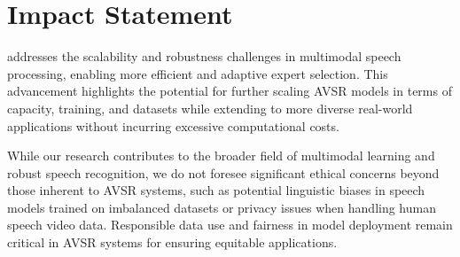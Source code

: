 \section*{Impact Statement}

\ourmodel addresses the scalability and robustness challenges in multimodal speech processing, enabling more efficient and adaptive expert selection. This advancement highlights the potential for further scaling AVSR models in terms of capacity, training, and datasets while extending to more diverse real-world applications without incurring excessive computational costs.

While our research contributes to the broader field of multimodal learning and robust speech recognition, we do not foresee significant ethical concerns beyond those inherent to AVSR systems, such as potential linguistic biases in speech models trained on imbalanced datasets or privacy issues when handling human speech video data. Responsible data use and fairness in model deployment remain critical in AVSR systems for ensuring equitable applications.
